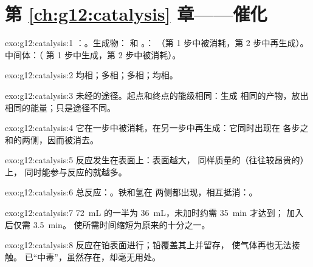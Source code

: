 \section*{第 \ref{ch:g12:catalysis} 章——催化}

\begin{solution}{exo:g12:catalysis:1}
：。生成物： 和 。：
（第 1 步中被消耗，第 2 步中再生成）。中间体：（
第 1 步中生成，第 2 步中被消耗）。
\end{solution}

\begin{solution}{exo:g12:catalysis:2}
均相；多相；多相；均相。
\end{solution}

\begin{solution}{exo:g12:catalysis:3}
未经的途径。起点和终点的能级相同：生成
相同的产物，放出相同的能量；只是途径不同。
\end{solution}

\begin{solution}{exo:g12:catalysis:4}
它在一步中被消耗，在另一步中再生成：它同时出现在
各步之和的两侧，因而被消去。
\end{solution}

\begin{solution}{exo:g12:catalysis:5}
反应发生在表面上：表面越大，
同样质量的（往往较昂贵的）上，
同时能参与反应的就越多。
\end{solution}

\begin{solution}{exo:g12:catalysis:6}
总反应：。铁和氢在
两侧都出现，相互抵消：。
\end{solution}

\begin{solution}{exo:g12:catalysis:7}
\qty{72}{mL} 的一半为 \qty{36}{mL}，未加时约需 \qty{35}{min} 才达到；
加入后仅需 \qty{3.5}{min}。
使所需时间缩短为原来的十分之一。
\end{solution}

\begin{solution}{exo:g12:catalysis:8}
反应在铂表面进行；铅覆盖其上并留存，
使气体再也无法接触。
已“中毒”，虽然存在，却毫无用处。
\end{solution}


